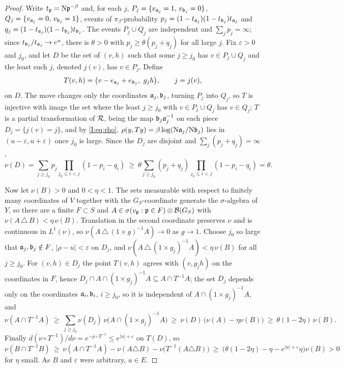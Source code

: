 \begin{proof}
Write $t_{\mathfrak{p}}=\mathrm{N}\mathfrak{p}^{-\beta}$ and, for each $j$,
$P_j=\{v_{\mathfrak{a}_j}=1,\,v_{\mathfrak{b}_j}=0\}$, $Q_j=\{v_{\mathfrak{a}_j}=0,\,v_{\mathfrak{b}_j}=1\}$, events of
$\pi_\beta$-probability $p_j=(1-t_{\mathfrak{a}_j})(1-t_{\mathfrak{b}_j})t_{\mathfrak{a}_j}$ and
$q_j=(1-t_{\mathfrak{a}_j})(1-t_{\mathfrak{b}_j})t_{\mathfrak{b}_j}$. The events $P_j\cup Q_j$ are independent and
$\sum_jp_j=\infty$; since $t_{\mathfrak{b}_j}/t_{\mathfrak{a}_j}\to e^{u}$, there is $\theta>0$ with
$p_j\ge\theta(p_j+q_j)$ for all large $j$. Fix $\varepsilon>0$ and $j_0$, and let $D$ be the
set of $(v,h)$ such that some $j\ge j_0$ has $v\in P_j\cup Q_j$ and the least such $j$,
denoted $j(v)$, has $v\in P_j$. Define
\[
T(v,h)=\bigl(v-e_{\aaa_j}+e_{\bb_j},\ g_jh\bigr),\qquad j=j(v),
\]
on $D$. The move changes only the coordinates $\mathfrak{a}_j,\mathfrak{b}_j$, turning $P_j$ into $Q_j$, so
$T$ is injective with image the set where the least $j\ge j_0$ with $v\in P_j\cup Q_j$ has
$v\in Q_j$; $T$ is a partial transformation of $\mathcal{R}$, being the map $\mathfrak{b}_j\mathfrak{a}_j^{-1}$ on
each piece $D_j=\{j(v)=j\}$, and by \eqref{I:eq:rho}, $\rho(y,Ty)=\beta\log(\mathrm{N}\mathfrak{a}_j/\mathrm{N}\mathfrak{b}_j)$
lies in $(u-\varepsilon,u+\varepsilon)$ once $j_0$ is large. Since the $D_j$ are disjoint
and $\sum_j(p_j+q_j)=\infty$,
\[
\nu(D)=\sum_{j\ge j_0}p_j\prod_{j_0\le i<j}(1-p_i-q_i)
\ \ge\ \theta\sum_{j\ge j_0}(p_j+q_j)\prod_{j_0\le i<j}(1-p_i-q_i)=\theta .
\]

Now let $\nu(B)>0$ and $0<\eta<1$. The sets measurable with respect to finitely many
coordinates of $V$ together with the $G_S$-coordinate generate the $\sigma$-algebra of $Y$,
so there are a finite $F\subset S$ and $A\in\sigma(v_{\mathfrak{p}}:\mathfrak{p}\in F)\otimes\mathcal B(G_S)$ with
$\nu(A\,\triangle\,B)<\eta\,\nu(B)$. Translation in the second coordinate preserves $\nu$
and is continuous in $L^1(\nu)$, so $\nu(A\,\triangle\,(1\times g)^{-1}A)\to0$ as $g\to1$.
Choose $j_0$ so large that $\mathfrak{a}_j,\mathfrak{b}_j\notin F$, $|\rho-u|<\varepsilon$ on $D_j$, and
$\nu(A\,\triangle\,(1\times g_j)^{-1}A)<\eta\,\nu(B)$ for all $j\ge j_0$. For
$(v,h)\in D_j$ the point $T(v,h)$ agrees with $(v,g_jh)$ on the coordinates in $F$, hence
$D_j\cap A\cap(1\times g_j)^{-1}A\subseteq A\cap T^{-1}A$; the set $D_j$ depends only on
the coordinates $\mathfrak{a}_i,\mathfrak{b}_i$, $i\ge j_0$, so it is independent of
$A\cap(1\times g_j)^{-1}A$, and
\[
\nu(A\cap T^{-1}A)\ \ge\ \sum_{j\ge j_0}\nu(D_j)\,\nu\bigl(A\cap(1\times g_j)^{-1}A\bigr)
\ \ge\ \nu(D)\,\bigl(\nu(A)-\eta\nu(B)\bigr)\ \ge\ \theta(1-2\eta)\,\nu(B).
\]
Finally $d(\nu\circ T^{-1})/d\nu=e^{-\rho\circ T^{-1}}\le e^{|u|+\varepsilon}$ on $T(D)$, so
\[
\nu(B\cap T^{-1}B)\ \ge\ \nu(A\cap T^{-1}A)-\nu(A\triangle B)-\nu\bigl(T^{-1}(A\triangle B)\bigr)
\ \ge\ \bigl(\theta(1-2\eta)-\eta-e^{|u|+\varepsilon}\eta\bigr)\nu(B)>0
\]
for $\eta$ small. As $B$ and $\varepsilon$ were arbitrary, $u\in E$.
\end{proof}

